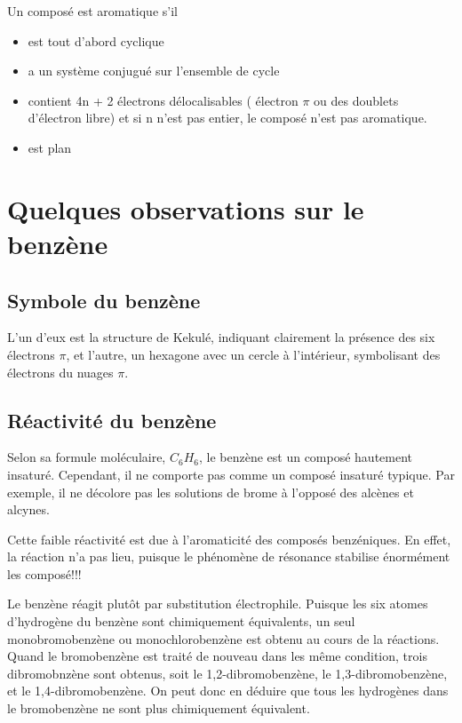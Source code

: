 Un composé est aromatique s'il
\begin{itemize}
  \item est tout d'abord cyclique
  \item a un système conjugué sur l'ensemble de cycle
  \item contient 4n + 2 électrons délocalisables ( électron $\pi$ ou des doublets d'électron libre) et si n n'est pas entier, le composé n'est pas aromatique.
  \item est plan
\end{itemize}


\section{Quelques observations sur le benzène}

\subsection{Symbole du benzène}
L'un d'eux est la structure de Kekulé, indiquant clairement la présence des six électrons $\pi$, et l'autre, un hexagone avec un cercle à l'intérieur, symbolisant des électrons du nuages $\pi$.

\subsection{Réactivité du benzène}

Selon sa formule moléculaire, $C_6H_6$, le benzène est un composé hautement insaturé.
Cependant, il ne comporte pas comme un composé insaturé typique.
Par exemple, il ne décolore pas les solutions de brome à l'opposé des alcènes et alcynes.

Cette faible réactivité est due à l'aromaticité des composés benzéniques.
En effet, la réaction n'a pas lieu, puisque le phénomène de résonance stabilise énormément les composé!!!


Le benzène réagit plutôt par substitution  électrophile.
Puisque les six atomes d'hydrogène du benzène sont chimiquement équivalents, un seul monobromobenzène ou monochlorobenzène est obtenu au cours de la réactions.
Quand le bromobenzène est traité de nouveau dans les même condition, trois dibromobnzène sont obtenus, soit le 1,2-dibromobenzène, le 1,3-dibromobenzène, et le 1,4-dibromobenzène.
On peut donc en déduire que tous les hydrogènes dans le bromobenzène ne sont plus chimiquement équivalent.



